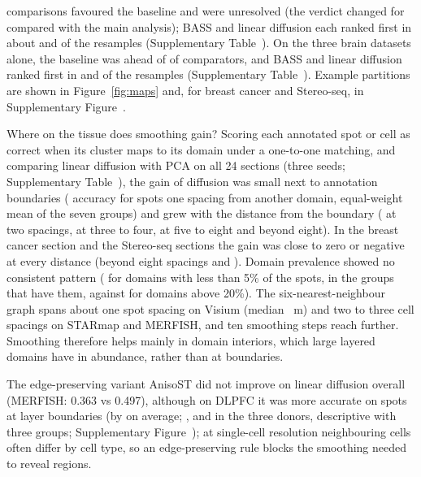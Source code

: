 \documentclass[unnumsec,webpdf,contemporary,large]{oup-authoring-template}
\newcommand{\figref}[1]{Figure~\ref{#1}}
\begin{document}
\nRobBetterExpert{} comparisons favoured the baseline and \nRobUnresExpert{} were unresolved (the verdict changed for \listExpertFlip{} compared with the main analysis); BASS and linear diffusion each ranked
first in about \pBestBassExpert{} and \pBestLinExpert{} of the resamples (Supplementary Table~\STstatsexpert). On the three brain datasets alone, the baseline was ahead of \nRobBetterBrain{} of \nRobTotBrain{} comparators, and BASS and linear diffusion ranked first in \pBestBassBrain{} and \pBestLinBrain{} of the resamples (Supplementary Table~\STstatsbrain). Example partitions are
shown in \figref{fig:maps} and, for breast cancer and Stereo-seq, in Supplementary Figure~\SFmapsnew.

Where on the tissue does smoothing gain? Scoring each annotated spot or cell as correct when its cluster maps to its
domain under a one-to-one matching, and comparing linear diffusion with PCA on all 24 sections (three seeds; Supplementary Table~\STbound),
the gain of diffusion was small next to annotation boundaries (\vcBoundOne{} accuracy for spots one spacing from another domain, equal-weight
mean of the seven groups) and grew with the distance from the boundary (\vcBoundTwo{} at two spacings, \vcBoundMid{} at three to four,
\vcBoundFar{} at five to eight and \vcBoundDeep{} beyond eight). In the breast cancer section and the Stereo-seq sections the gain was close
to zero or negative at every distance (beyond eight spacings \vcBoundDeepBrca{} and \vcBoundDeepStereo{}). Domain prevalence showed no
consistent pattern (\vcPrevSmall{} for domains with less than 5\% of the spots, in the \vcPrevSmallN{} groups that have them, against
\vcPrevLarge{} for domains above 20\%). The six-nearest-neighbour graph spans about one spot spacing on Visium (median \vcKnnVisium{}~\textmu m)
and two to three cell spacings on STARmap and MERFISH, and ten smoothing steps reach further. Smoothing therefore helps mainly in domain
interiors, which large layered domains have in abundance, rather than at boundaries.

The edge-preserving variant AnisoST did not improve on linear diffusion overall (MERFISH: 0.363 vs 0.497), although on DLPFC it
was more accurate on spots at layer boundaries (by \vsBoundMean{} on average; \vsBoundBrA, \vsBoundBrB{} and \vsBoundBrC{} in the three donors, descriptive with three
groups; Supplementary Figure~\SFboundary); at single-cell resolution neighbouring cells often differ by cell type, so an edge-preserving
rule blocks the smoothing needed to reveal regions.
\end{document}
